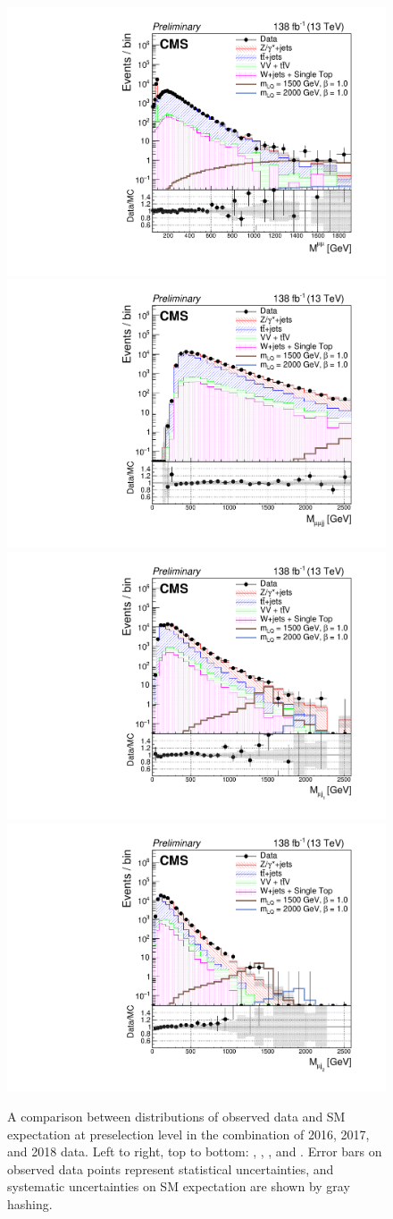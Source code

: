 \begin{figure}[H]
       \centering
       {\includegraphics[width=.49\textwidth]{Images/Analysis/Results_combined_Unblinded/Plots/Preselection/BasicLQ_uujj_M_uu_standard.pdf}}
       {\includegraphics[width=.49\textwidth]{Images/Analysis/Results_combined_Unblinded/Plots/Preselection/BasicLQ_uujj_M_uujj_standard.pdf}}
       {\includegraphics[width=.49\textwidth]{Images/Analysis/Results_combined_Unblinded/Plots/Preselection/BasicLQ_uujj_M_uujj1_standard.pdf}}
       {\includegraphics[width=.49\textwidth]{Images/Analysis/Results_combined_Unblinded/Plots/Preselection/BasicLQ_uujj_M_uujj2_standard.pdf}}
       \caption{A comparison between distributions of observed data and SM expectation at preselection level in the combination of 2016, 2017, and 2018 data. Left to right, top to bottom: \Muu, \Muujj, \MujOne, and \MujTwo. Error bars on observed data points represent statistical uncertainties, and systematic uncertainties on SM expectation are shown by gray hashing.}
       \label{fig:preselmassCombined}
\end{figure}


